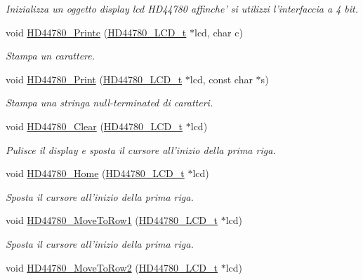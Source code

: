 \begin{DoxyCompactItemize}
\begin{DoxyCompactList}\small\item\em Inizializza un oggetto display lcd H\+D44780 affinche' si utilizzi l'interfaccia a 4 bit. \end{DoxyCompactList}\item 
void \hyperlink{group___l_c_d_ga57b8c6ca0b3c12e5f7273b3c373a6f17}{H\+D44780\+\_\+\+Printc} (\hyperlink{struct_h_d44780___l_c_d__t}{H\+D44780\+\_\+\+L\+C\+D\+\_\+t} $\ast$lcd, char c)
\begin{DoxyCompactList}\small\item\em Stampa un carattere. \end{DoxyCompactList}\item 
void \hyperlink{group___l_c_d_ga3aedff8e2040e62db569fde955d3987b}{H\+D44780\+\_\+\+Print} (\hyperlink{struct_h_d44780___l_c_d__t}{H\+D44780\+\_\+\+L\+C\+D\+\_\+t} $\ast$lcd, const char $\ast$s)
\begin{DoxyCompactList}\small\item\em Stampa una stringa null-\/terminated di caratteri. \end{DoxyCompactList}\item 
void \hyperlink{group___l_c_d_ga38cac13d7a66f068be54f79a716ff7d4}{H\+D44780\+\_\+\+Clear} (\hyperlink{struct_h_d44780___l_c_d__t}{H\+D44780\+\_\+\+L\+C\+D\+\_\+t} $\ast$lcd)
\begin{DoxyCompactList}\small\item\em Pulisce il display e sposta il cursore all'inizio della prima riga. \end{DoxyCompactList}\item 
void \hyperlink{group___l_c_d_ga68e3712332aa9482d4bdaa4991a92127}{H\+D44780\+\_\+\+Home} (\hyperlink{struct_h_d44780___l_c_d__t}{H\+D44780\+\_\+\+L\+C\+D\+\_\+t} $\ast$lcd)
\begin{DoxyCompactList}\small\item\em Sposta il cursore all'inizio della prima riga. \end{DoxyCompactList}\item 
void \hyperlink{group___l_c_d_gad90e2924a4e632ce42940323f8f49e37}{H\+D44780\+\_\+\+Move\+To\+Row1} (\hyperlink{struct_h_d44780___l_c_d__t}{H\+D44780\+\_\+\+L\+C\+D\+\_\+t} $\ast$lcd)
\begin{DoxyCompactList}\small\item\em Sposta il cursore all'inizio della prima riga. \end{DoxyCompactList}\item 
void \hyperlink{group___l_c_d_ga713670d498b6f5d50a174df19081c515}{H\+D44780\+\_\+\+Move\+To\+Row2} (\hyperlink{struct_h_d44780___l_c_d__t}{H\+D44780\+\_\+\+L\+C\+D\+\_\+t} $\ast$lcd)

\end{DoxyCompactItemize}
